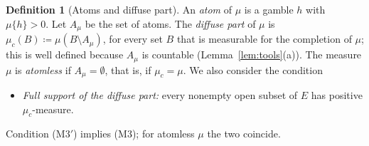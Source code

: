 \documentclass[11pt]{article}
\theoremstyle{plain}
\theoremstyle{definition}
\newtheorem{definition}[theorem]{Definition}
\begin{document}
\begin{definition}[Atoms and diffuse part]\label{def:atoms}
An \emph{atom} of $\mu$ is a gamble $h$ with $\mu\{h\}>0$. Let $A_\mu$ be the set of atoms. The
\emph{diffuse part} of $\mu$ is $\mu_c(B)\coloneqq\mu(B\setminus A_\mu)$, for every set $B$
that is measurable for the completion of $\mu$; this is well defined because $A_\mu$ is
countable (Lemma~\ref{lem:tools}(a)). The measure $\mu$ is \emph{atomless} if
$A_\mu=\emptyset$, that is, if $\mu_c=\mu$. We also consider the condition
\begin{itemize}
  \item[(M3$'$)] \emph{Full support of the diffuse part:} every nonempty open subset of $E$ has
  positive $\mu_c$-measure.
\end{itemize}
Condition (M3$'$) implies (M3); for atomless $\mu$ the two coincide.


\end{definition}
\end{document}
